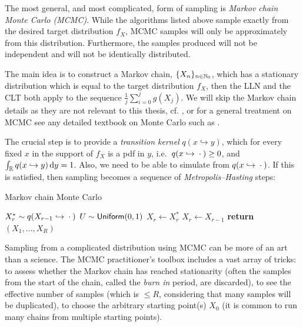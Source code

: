 The most general, and most complicated, form of sampling is \emph{Markov chain Monte Carlo (MCMC)}. While the algorithms listed above sample exactly from the desired target distribution $f_X$, MCMC samples will only be approximately from this distribution. Furthermore, the samples produced will not be independent and will not be identically distributed.

The main idea is to construct a Markov chain, $\{ X_n \}_{n\in\mathbb{N}_0}$, which has a stationary distribution which is equal to the target distribution $f_X$, then the LLN and the CLT both apply to the sequence $\frac1j\sum_{i=0}^j g(X_j)$. We will skip the Markov chain details as they are not relevant to this thesis, cf. \cite{meyn2012markov}, or for a general treatment on MCMC see any detailed textbook on Monte Carlo such as \cite{asmussen2007stochastic,glasserman2003monte,kroese2013handbook}.

The crucial step is to provide a \emph{transition kernel} $q(x \hookrightarrow y)$, which for every fixed $x$ in the support of $f_X$ is a pdf in $y$, i.e.\ $q(x \hookrightarrow {}\cdot{}) \ge 0$, and $\int_{\mathbb{R}} q(x \hookrightarrow y) \mathop{}\!\mathrm{d} y = 1$. Also, we need to be able to simulate from $q(x \hookrightarrow {}\cdot{})$. If this is satisfied, then sampling becomes a sequence of \emph{Metropolis--Hasting} steps:

\begin{algorithm}
\caption{Markov chain Monte Carlo}
\label{alg:mcmc}
\begin{algorithmic}[1]
\State $X_r^\ast \sim q(X_{r-1} \hookrightarrow {}\cdot{})$
\State $U \sim \mathsf{Uniform}(0,1)$
\State $X_r \gets X_r^\ast$
\Else
\State $X_r \gets X_{r-1}$
\EndIf
\EndFor
\State \textbf{return} $(X_1, \dots, X_R)$
\EndFunction
\end{algorithmic}
\end{algorithm}

Sampling from a complicated distribution using MCMC can be more of an art than a science. The MCMC practitioner's toolbox includes a vast array of tricks: to assess whether the Markov chain has reached stationarity (often the samples from the start of the chain, called the \emph{burn in} period, are discarded), to see the effective number of samples (which is $\le R$, considering that many samples will be duplicated), to choose the arbitrary starting point(s) $X_0$ (it is common to run many chains from multiple starting points).

